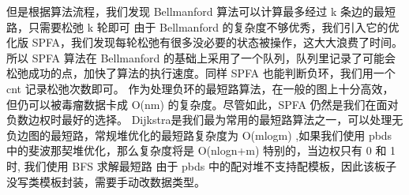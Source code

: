 {}但是根据算法流程，我们发现\markdownRendererDollarSign{} Bellmanford \markdownRendererDollarSign{}算法可以计算最多经过\markdownRendererDollarSign{} k \markdownRendererDollarSign{}条边的最短路，只需要松弛\markdownRendererDollarSign{} k \markdownRendererDollarSign{}轮即可\markdownRendererInterblockSeparator
{}\markdownRendererInterblockSeparator
{}
\markdownRendererSectionEnd \markdownRendererSectionBegin
{}\markdownRendererInterblockSeparator
{}由于 \markdownRendererDollarSign{}Bellmanford\markdownRendererDollarSign{} 的复杂度不够优秀，我们引入它的优化版 \markdownRendererDollarSign{}SPFA\markdownRendererDollarSign{}，我们发现每轮松弛有很多没必要的状态被操作，这大大浪费了时间。\markdownRendererParagraphSeparator
{}所以 \markdownRendererDollarSign{}SPFA\markdownRendererDollarSign{} 算法在 \markdownRendererDollarSign{}Bellmanford\markdownRendererDollarSign{} 的基础上采用了一个队列，队列里记录了可能会松弛成功的点，加快了算法的执行速度。同样 \markdownRendererDollarSign{}SPFA\markdownRendererDollarSign{} 也能判断负环，我们用一个 \markdownRendererDollarSign{}cnt\markdownRendererDollarSign{} 记录松弛次数即可。\markdownRendererParagraphSeparator
{}作为处理负环的最短路算法，在一般的图上十分高效，但仍可以被毒瘤数据卡成 \markdownRendererDollarSign{}O(nm)\markdownRendererDollarSign{} 的复杂度。尽管如此，\markdownRendererDollarSign{}SPFA\markdownRendererDollarSign{} 仍然是我们在面对负数边权时最好的选择。\markdownRendererInterblockSeparator
{}\markdownRendererInterblockSeparator
{}
\markdownRendererSectionEnd \markdownRendererSectionBegin
{}\markdownRendererInterblockSeparator
{}Dijkstra是我们最为常用的最短路算法之一，可以处理无负边图的最短路，常规堆优化的最短路复杂度为\markdownRendererDollarSign{} O(mlogm) \markdownRendererDollarSign{},如果我们使用\markdownRendererDollarSign{} pbds \markdownRendererDollarSign{}中的斐波那契堆优化，那么复杂度将是\markdownRendererDollarSign{} O(nlogn+m) \markdownRendererDollarSign{}\markdownRendererParagraphSeparator
{}特别的，当边权只有 \markdownRendererDollarSign{}0\markdownRendererDollarSign{} 和 \markdownRendererDollarSign{}1\markdownRendererDollarSign{} 时, 我们使用 \markdownRendererDollarSign{}BFS\markdownRendererDollarSign{} 求解最短路\markdownRendererParagraphSeparator
{}由于\markdownRendererDollarSign{} pbds \markdownRendererDollarSign{}中的配对堆不支持配模板，因此该板子没写类模板封装，需要手动改数据类型。\markdownRendererInterblockSeparator
